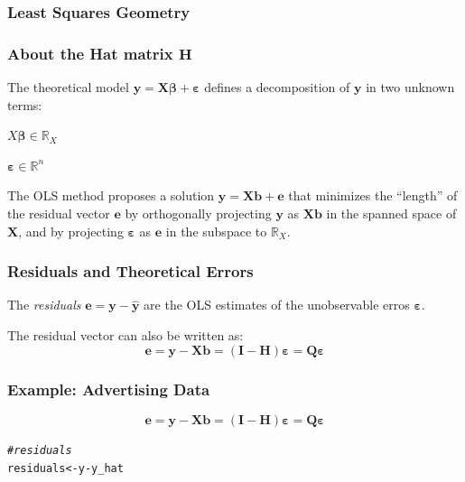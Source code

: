 \documentclass[12pt]{beamer}\usepackage[]{graphicx}\usepackage[]{color}
\makeatletter
\newcommand{\hlcom}[1]{\textcolor[rgb]{0.678,0.584,0.686}{\textit{#1}}}%
\newcommand{\hlopt}[1]{\textcolor[rgb]{0,0,0}{#1}}%
\newcommand{\hlstd}[1]{\textcolor[rgb]{0.345,0.345,0.345}{#1}}%
\newcommand{\hlkwb}[1]{\textcolor[rgb]{0.69,0.353,0.396}{#1}}%
\newenvironment{kframe}{%
 \def\at@end@of@kframe{}%
 \ifinner\ifhmode%
  \def\at@end@of@kframe{\end{minipage}}%
  \begin{minipage}{\columnwidth}%
 \fi\fi%
 \def\FrameCommand##1{\hskip\@totalleftmargin \hskip-\fboxsep
 \colorbox{shadecolor}{##1}\hskip-\fboxsep
     \hskip-\linewidth \hskip-\@totalleftmargin \hskip\columnwidth}%
 \MakeFramed {\advance\hsize-\width
   \@totalleftmargin\z@ \linewidth\hsize
   \@setminipage}}%
 {\par\unskip\endMakeFramed%
 \at@end@of@kframe}
\newenvironment{knitrout}{}{} %
\makeatother
\begin{document}

\begin{frame}
\frametitle{Least Squares Geometry}
\begin{center}
\end{center}
\end{frame}


\begin{frame}
\frametitle{About the Hat matrix $\mathbf{H}$}

The theoretical model $\mathbf{y = X \boldsymbol{\beta}} + \boldsymbol{\varepsilon}$
defines a decomposition of $\mathbf{y}$ in two unknown terms:
\bi
  \item $X \boldsymbol{\beta} \in \mathbb{R}_X$
  \item $\boldsymbol{\varepsilon} \in \mathbb{R}^n$
\ei

\pause
The OLS method proposes a solution $\mathbf{y = Xb + e}$ that minimizes the 
``length'' of the residual vector $\mathbf{e}$ by orthogonally projecting
$\mathbf{y}$ as $\mathbf{Xb}$ in the spanned space of $\mathbf{X}$, and by 
projecting $\boldsymbol{\varepsilon}$ as $\mathbf{e}$ in the subspace
to $\mathbb{R}_X$.

\end{frame}


\begin{frame}
\frametitle{Residuals and Theoretical Errors}

The \textit{residuals} $\mathbf{e = y - \hat{y}}$ are the OLS estimates of the unobservable erros $\boldsymbol{\varepsilon}$.

\bigskip
The residual vector can also be written as:
$$
\mathbf{e = y - Xb = (I - H) \boldsymbol{\varepsilon} = Q \boldsymbol{\varepsilon}}
$$

\end{frame}


\begin{frame}[fragile]
\frametitle{Example: Advertising Data}

$$
\mathbf{e = y - Xb = (I - H) \boldsymbol{\varepsilon} = Q \boldsymbol{\varepsilon}}
$$

\begin{knitrout}\footnotesize
{}\color{fgcolor}\begin{kframe}
\begin{alltt}
\hlcom{# residuals}
\hlstd{residuals} \hlkwb{<-} \hlstd{y} \hlopt{-} \hlstd{y_hat}
\end{alltt}
\end{kframe}
\end{knitrout}

\end{frame}
\end{document}
